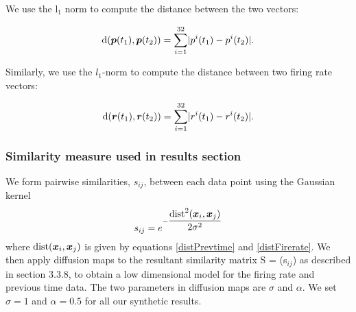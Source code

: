 We use the l$_{1}$ norm to compute the distance between the two vectors:

\begin{equation}\label{distPrevtime}
\text{d}(\boldsymbol{p}(t_{1}), \boldsymbol{p}(t_{2}) ) = 
\displaystyle \sum_{i=1}^{32} \lvert p^{i}(t_{1}) - p^{i}(t_{2})   \rvert.
\end{equation}

Similarly, we use the $l_{1}$-norm to compute the distance between two firing rate vectors:

\begin{equation}\label{distFirerate}
\text{d}(\boldsymbol{r}(t_{1}), \boldsymbol{r}(t_{2}) ) = 
\displaystyle \sum_{i=1}^{32} \lvert r^{i}(t_{1}) - r^{i}(t_{2})   \rvert.
\end{equation}


\subsubsection{Similarity measure used in results section}
We form pairwise similarities, $s_{ij}$, between each data point
using the Gaussian kernel 
\[
s_{ij} = e^{-\dfrac{\text{dist}^{2}(\boldsymbol{x}_{i}, \boldsymbol{x}_{j})}{2\sigma^2}} 
\]
where $\text{dist}(\boldsymbol{x}_{i}, \boldsymbol{x}_{j})$ is given by equations
\eqref{distPrevtime} and \eqref{distFirerate}.
We then apply diffusion maps to the resultant similarity matrix S = (s$_{ij}$) 
as described in section 3.3.8, to obtain a low dimensional model for the 
firing rate and previous time data.
The two parameters in diffusion maps are $\sigma$ and $\alpha$.
We set $\sigma =1$ and $\alpha = 0.5$ for all our synthetic results.

























